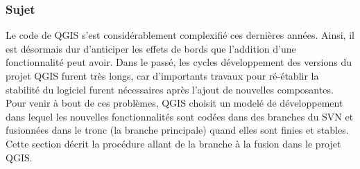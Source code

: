 \subsubsection{Sujet}

Le code de QGIS s'est considérablement complexifié ces dernières années. Ainsi, il est désormais dur d'anticiper les effets de bords que l'addition d'une fonctionnalité peut avoir. Dans le passé, les cycles développement des versions du projet QGIS furent très longs, car d'importants travaux pour ré-établir la stabilité du logiciel furent nécessaires après l'ajout de nouvelles composantes. Pour venir à bout de ces problèmes, QGIS choisit un modelé de développement dans lequel les nouvelles fonctionnalités sont codées dans des branches du SVN et fusionnées dans le tronc (la branche principale) quand elles sont finies et stables. Cette section décrit la procédure allant de la branche à la fusion dans le projet QGIS. 

